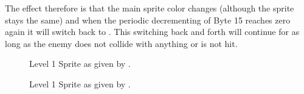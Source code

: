 The effect therefore is that the main sprite color changes (although the sprite stays the same) and when the 
periodic decrementing of Byte 15 reaches zero again it will switch back to . This 
switching back and forth will continue for as long as the enemy does not collide with anything or is not hit.

\begin{figure}[H]
  {
    \setlength{\tabcolsep}{3.0pt}
    \setlength\cmidrulewidth{\heavyrulewidth} %
	\centering
	\def\MULTICOLORONE{white}
	\def\MULTICOLORTWO{red}
	\def\SPRITECOLOR{blue}
	\begin{subfigure}{0.3\textwidth}
		
	\end{subfigure}
	\begin{subfigure}{0.3\textwidth}
		
	\end{subfigure}
	\begin{subfigure}{0.3\textwidth}
		
	\end{subfigure}
}\caption[position=top]{Level 1 Sprite as given by .}
\end{figure}

\begin{figure}[H]
  {
    \setlength{\tabcolsep}{3.0pt}
    \setlength\cmidrulewidth{\heavyrulewidth} %
	\centering
	\def\MULTICOLORONE{white}
	\def\MULTICOLORTWO{red}
	\def\SPRITECOLOR{c64_purple}
	\begin{subfigure}{0.3\textwidth}
		
	\end{subfigure}
	\begin{subfigure}{0.3\textwidth}
		
	\end{subfigure}
	\begin{subfigure}{0.3\textwidth}
		
	\end{subfigure}
}\caption[position=top]{Level 1 Sprite as given by .}
\end{figure}

